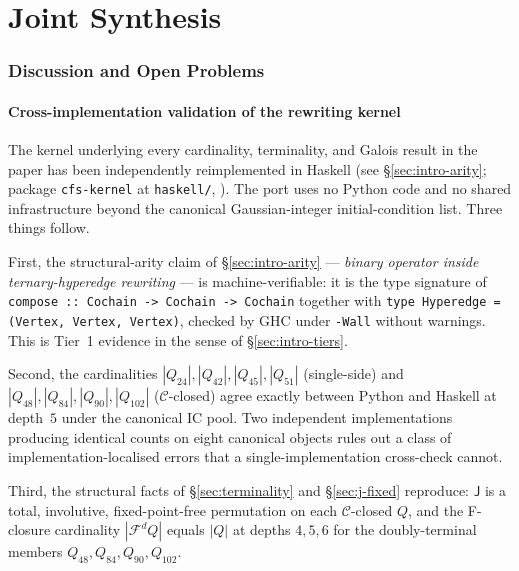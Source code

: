 \documentclass[12pt,a4paper]{article}
\theoremstyle{definition}
\theoremstyle{remark}
\newcommand{\Ccls}{\mathcal{C}}             %
\newcommand{\Fcls}{\mathcal{F}}             %
\newcommand{\Jconj}{\mathsf{J}}             %
\begin{document}
\part*{Joint Synthesis}

\section{Discussion and Open Problems}\label{sec:discussion}

\subsection{Cross-implementation validation of the rewriting kernel}
\label{sec:disc-cross-impl}

The kernel underlying every cardinality, terminality, and Galois result
in the paper has been independently reimplemented in Haskell (see
\S\ref{sec:intro-arity}; package \texttt{cfs-kernel} at
\texttt{haskell/}, \cite{haskell-cfs-kernel}). The port uses no Python
code and no shared infrastructure beyond the canonical
Gaussian-integer initial-condition list. Three things follow.

First, the structural-arity claim of \S\ref{sec:intro-arity} ---
\emph{binary operator inside ternary-hyperedge rewriting} --- is
machine-verifiable: it is the type signature of
\texttt{compose :: Cochain -> Cochain -> Cochain} together with
\texttt{type Hyperedge = (Vertex, Vertex, Vertex)}, checked by GHC
under \texttt{-Wall} without warnings. This is Tier~1 evidence in the
sense of \S\ref{sec:intro-tiers}.

Second, the cardinalities $|Q_{24}|, |Q_{42}|, |Q_{45}|, |Q_{51}|$
(single-side) and $|Q_{48}|, |Q_{84}|, |Q_{90}|, |Q_{102}|$
($\Ccls$-closed) agree exactly between Python and Haskell at depth~$5$
under the canonical IC pool. Two independent implementations producing
identical counts on eight canonical objects rules out a class of
implementation-localised errors that a single-implementation cross-check
cannot.

Third, the structural facts of \S\ref{sec:terminality} and
\S\ref{sec:j-fixed} reproduce: $\Jconj$ is a total, involutive,
fixed-point-free permutation on each $\Ccls$-closed $Q$, and the
F-closure cardinality $|\Fcls^d Q|$ equals $|Q|$ at depths $4, 5, 6$
for the doubly-terminal members $Q_{48}, Q_{84}, Q_{90}, Q_{102}$.
\end{document}
